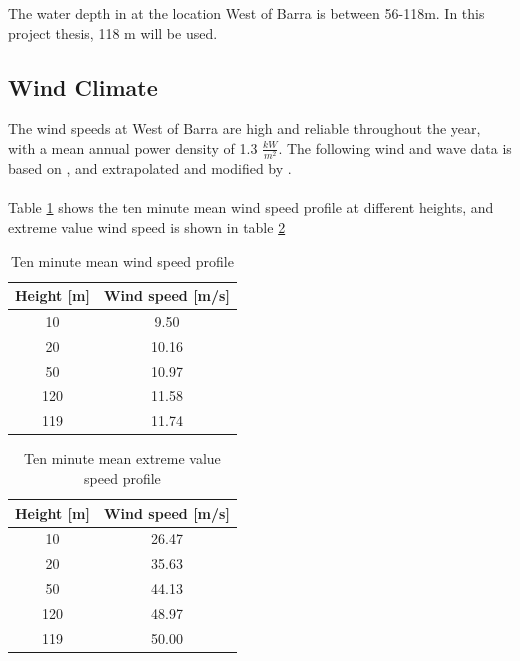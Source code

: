 \noindent The water depth in at the location West of Barra is between 56-118m. In this project thesis, 118 m will be used. 

\subsection{Wind Climate}
\label{sec:windcli}

The wind speeds at West of Barra are high and reliable throughout the year, with a mean annual power density of 1.3 $\frac{kW}{m^2}$. The following wind and wave data is based on \cite{geos2001}, and extrapolated and modified by \cite{Lifes50+D1.1}. 
\\\\
Table \ref{table:wind} shows the ten minute mean wind speed profile at different heights, and extreme value wind speed is shown in table  \ref{table:windex}
\begin{table} [H]
\centering
\begin{tabular}{ |c|c|}
\hline
 Height [m]& Wind speed [m/s]\\
 \hline
 \hline
 10 & 9.50 \\

 20 & 10.16 \\
 
 50 & 10.97 \\
 
 120 & 11.58 \\

 119 & 11.74  \\
 \hline
\end{tabular}
\caption{Ten minute mean wind speed profile}
\label{table:wind}
\end{table}

\begin{table} [H]
\centering
\begin{tabular}{ |c|c|}
\hline
 Height [m]& Wind speed [m/s]\\
 \hline
 \hline
 10 & 26.47 \\

 20 & 35.63 \\
 
 50 & 44.13 \\
 
 120 & 48.97 \\

 119 & 50.00  \\
 \hline
\end{tabular}
\caption{Ten minute mean extreme value speed profile}
\label{table:windex}
\end{table}


